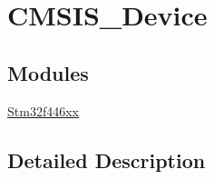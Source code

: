 \hypertarget{group___c_m_s_i_s___device}{}\section{C\+M\+S\+I\+S\+\_\+\+Device}
\label{group___c_m_s_i_s___device}
\subsection*{Modules}
\begin{DoxyCompactItemize}
\item 
\hyperlink{group__stm32f446xx}{Stm32f446xx}
\end{DoxyCompactItemize}


\subsection{Detailed Description}
